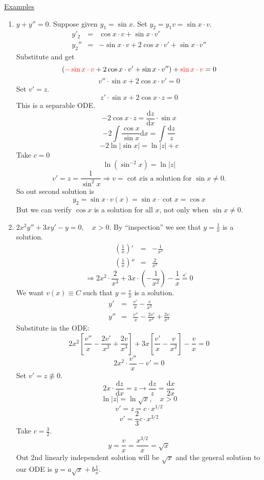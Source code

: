 \documentclass{article}
\newcommand{\mathd}{\mathrm{d}}
\newcommand{\nequiv}{\mathrel{\not\equiv}}
\newcommand{\tmcolor}[2]{{\color{#1}{#2}}}
\begin{document}
{\underline{Examples}}
\begin{enumerate}
  \item $y + y'' = 0$. Suppose given $y_1 = \sin x$. Set $y_2 = y_1 v = \sin x
  \cdot v$.
  \begin{eqnarray*}
    y'_2 & = & \cos x \cdot v + \sin x \cdot v'\\
    y_2'' & = & - \sin x \cdot v + 2 \cos x \cdot v' + \sin x \cdot v''
  \end{eqnarray*}
  Substitute and get
  \[ (\tmcolor{red}{- \sin x \cdot v} + 2 \cos x \cdot v' + \sin x \cdot v'')
     + \tmcolor{red}{\sin x \cdot v} = 0 \]
  \[ v'' \cdot \sin x + 2 \cos x \cdot v' = 0 \]
  Set $v' = z$.
  \[ z' \cdot \sin x + 2 \cos x \cdot z = 0 \]
  This is a separable ODE.
  \[ - 2 \cos x \cdot z = \frac{\mathd z}{\mathd x} \cdot \sin x \]
  \[ - 2 \int \frac{\cos x}{\sin x} \mathd x = \int \frac{\mathd z}{z} \]
  \[ - 2 \ln | \sin x | = \ln | z | + c \]
  Take $c = 0$
  \[ \ln (\sin^{- 2} x) = \ln | z | \]
  \[ v' = z = \frac{1}{\sin^2 x} \Rightarrow v = \cot x \text{is a solution
     for $\sin x \neq 0$.} \]
  So out second solution is
  \[ y_2 = \sin x \cdot v (x) = \sin x \cdot \cot x = \cos x \]
  But we can verify $\cos x$ is a solution for all $x$, not only when $\sin x
  \neq 0$.
  
  \item $2 x^2 y'' + 3 xy' - y = 0, \quad x > 0$. By ``inspection'' we see
  that $y = \frac{1}{x}$ is a solution.
  \begin{eqnarray*}
    \left( \frac{1}{x} \right)' & = & - \frac{1}{x^2}\\
    \left( \frac{1}{x} \right)'' & = & \frac{2}{x^3}
  \end{eqnarray*}
  \[ \Rightarrow 2 x^2 \cdot \frac{2}{x^3} + 3 x \cdot \left( - \frac{1}{x^2}
     \right) - \frac{1}{x}  \overset{\checkmark}{=} 0 \]
  We want $v (x) \equiv C$ such that $y = \frac{v}{x}$ is a solution.
  \begin{eqnarray*}
    y' & = & \frac{v'}{x} - \frac{v}{x^2}\\
    y'' & = & \frac{v''}{x} - \frac{2 v'}{x^2} + \frac{2 v}{x^3}
  \end{eqnarray*}
  Substitute in the ODE:
  \[ 2 x^2  \left[ \frac{v''}{x} - \frac{2 v'}{x^2} + \frac{2 v}{x^3} \right]
     + 3 x \left[ \frac{v'}{x} - \frac{v}{x^2} \right] - \frac{v}{x} = 0 \]
  \[ 2 x^2 \cdot \frac{v''}{x} - v' = 0 \]
  Set $v' = z \nequiv 0$.
  \[ 2 x \cdot \frac{\mathd z}{\mathd x} = z \rightarrow \frac{\mathd z}{z} =
     \frac{\mathd x}{2 x} \]
  \[ \ln | z | = \ln \sqrt{x}, \quad x > 0 \]
  \[ v' = z = c \cdot x^{1 / 2} \]
  \[ v' = \frac{2}{3} c \cdot x^{3 / 2} \]
  Take $c = \frac{3}{2}$.
  \[ y = \frac{v}{x} = \frac{x^{3 / 2}}{x} = \sqrt{x} \]
  Out 2nd linearly independent solution will be $\sqrt{x}$ and the general
  solution to our ODE is $y = a \sqrt{x} + b \frac{1}{x}$.
  

\end{enumerate}
\end{document}
